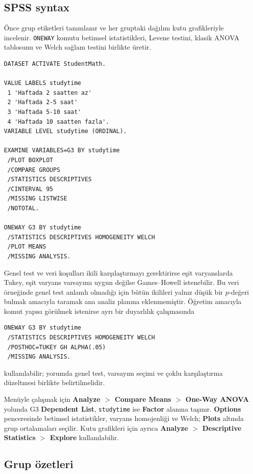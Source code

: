\subsection{SPSS syntax}

Önce grup etiketleri tanımlanır ve her gruptaki dağılım kutu grafikleriyle
incelenir. \texttt{ONEWAY} komutu betimsel istatistikleri, Levene testini,
klasik ANOVA tablosunu ve Welch sağlam testini birlikte üretir.

\begin{lstlisting}[language={}]
DATASET ACTIVATE StudentMath.

VALUE LABELS studytime
 1 'Haftada 2 saatten az'
 2 'Haftada 2-5 saat'
 3 'Haftada 5-10 saat'
 4 'Haftada 10 saatten fazla'.
VARIABLE LEVEL studytime (ORDINAL).

EXAMINE VARIABLES=G3 BY studytime
 /PLOT BOXPLOT
 /COMPARE GROUPS
 /STATISTICS DESCRIPTIVES
 /CINTERVAL 95
 /MISSING LISTWISE
 /NOTOTAL.

ONEWAY G3 BY studytime
 /STATISTICS DESCRIPTIVES HOMOGENEITY WELCH
 /PLOT MEANS
 /MISSING ANALYSIS.
\end{lstlisting}

Genel test ve veri koşulları ikili karşılaştırmayı gerektirirse eşit
varyanslarda Tukey, eşit varyans varsayımı uygun değilse Games--Howell
istenebilir. Bu veri örneğinde genel test anlamlı olmadığı için bütün ikilileri
yalnız düşük bir $p$-değeri bulmak amacıyla taramak ana analiz planına
eklenmemiştir. Öğretim amacıyla komut yapısı görülmek istenirse ayrı bir
duyarlılık çalışmasında

\begin{lstlisting}[language={}]
ONEWAY G3 BY studytime
 /STATISTICS DESCRIPTIVES HOMOGENEITY WELCH
 /POSTHOC=TUKEY GH ALPHA(.05)
 /MISSING ANALYSIS.
\end{lstlisting}

kullanılabilir; yorumda genel test, varsayım seçimi ve çoklu karşılaştırma
düzeltmesi birlikte belirtilmelidir.

Menüyle çalışmak için \textbf{Analyze $>$ Compare Means $>$ One-Way ANOVA}
yolunda G3 \textbf{Dependent List}, \texttt{studytime} ise \textbf{Factor}
alanına taşınır. \textbf{Options} penceresinde betimsel istatistikler,
varyans homojenliği ve Welch; \textbf{Plots} altında grup ortalamaları seçilir.
Kutu grafikleri için ayrıca \textbf{Analyze $>$ Descriptive Statistics $>$
Explore} kullanılabilir.

\subsection{Grup özetleri}

